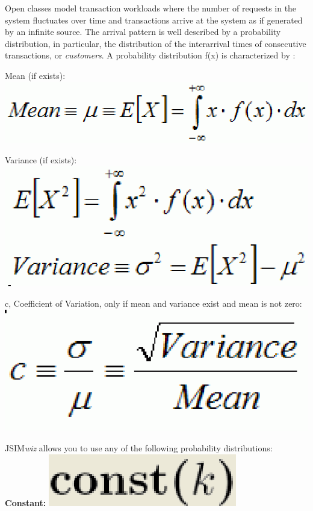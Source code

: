 Open classes model transaction workloads where the number of requests in the system fluctuates over time and transactions arrive at the system as if generated by an infinite source. The arrival pattern is well described by a probability distribution, in particular, the distribution of the interarrival times of consecutive transactions, or \emph{customers}.
A probability distribution f(x) is characterized by :
\begin{itemize*}
\item Mean (if exists): \includegraphics[scale=.5]{img/jsim/Mean.eps}
\item Variance (if exists): \includegraphics[scale=.5]{img/jsim/variance.eps}
\item c, Coefficient of Variation, only if mean and variance exist and mean is not zero: \includegraphics[scale=.5]{img/jsim/CoeffVariation.eps}
\end{itemize*}
JSIM\emph{wiz} allows you to use any of the following probability distributions:
\\ %
\textbf{Constant: }\includegraphics[scale=.5]{img/jsim/constant_f.eps}
